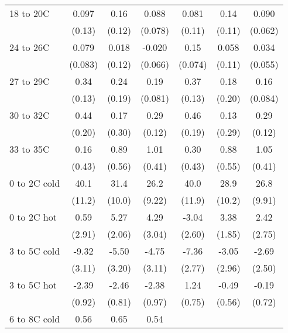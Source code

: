\documentclass[paper=letterpaper, fontsize=11pt]{article} %
\begin{document}
\begin{longtable}{l*{6}{c}}
18 to 20C           &       0.097&        0.16&       0.088&       0.081&        0.14&       0.090\\
                    &      (0.13)&      (0.12)&     (0.078)&      (0.11)&      (0.11)&     (0.062)\\
24 to 26C           &       0.079&       0.018&      -0.020&        0.15&       0.058&       0.034\\
                    &     (0.083)&      (0.12)&     (0.066)&     (0.074)&      (0.11)&     (0.055)\\
27 to 29C           &        0.34&        0.24&        0.19&        0.37&        0.18&        0.16\\
                    &      (0.13)&      (0.19)&     (0.081)&      (0.13)&      (0.20)&     (0.084)\\
30 to 32C           &        0.44&        0.17&        0.29&        0.46&        0.13&        0.29\\
                    &      (0.20)&      (0.30)&      (0.12)&      (0.19)&      (0.29)&      (0.12)\\
33 to 35C           &        0.16&        0.89&        1.01&        0.30&        0.88&        1.05\\
                    &      (0.43)&      (0.56)&      (0.41)&      (0.43)&      (0.55)&      (0.41)\\
0 to 2C cold        &        40.1&        31.4&        26.2&        40.0&        28.9&        26.8\\
                    &      (11.2)&      (10.0)&      (9.22)&      (11.9)&      (10.2)&      (9.91)\\
0 to 2C hot         &        0.59&        5.27&        4.29&       -3.04&        3.38&        2.42\\
                    &      (2.91)&      (2.06)&      (3.04)&      (2.60)&      (1.85)&      (2.75)\\
3 to 5C cold        &       -9.32&       -5.50&       -4.75&       -7.36&       -3.05&       -2.69\\
                    &      (3.11)&      (3.20)&      (3.11)&      (2.77)&      (2.96)&      (2.50)\\
3 to 5C hot         &       -2.39&       -2.46&       -2.38&        1.24&       -0.49&       -0.19\\
                    &      (0.92)&      (0.81)&      (0.97)&      (0.75)&      (0.56)&      (0.72)\\
6 to 8C cold        &        0.56&        0.65&        0.54&            &            &            \\

\end{longtable}
\end{document}
